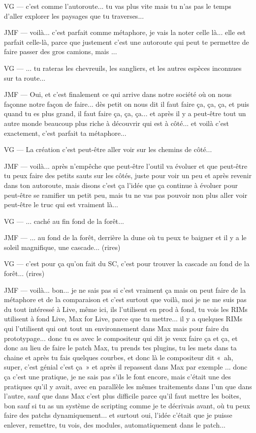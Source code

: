 VG — c'est comme l'autoroute... tu vas plus vite mais tu n'as pas le temps d'aller explorer les paysages que tu traverses...  

JMF — voilà... c'est parfait comme métaphore, je vais la noter celle là... elle est parfait celle-là, parce que justement c'est une autoroute qui peut te permettre de faire passer des gros camions, mais ... 

VG — ... tu rateras les chevreuils, les sangliers, et les autres espèces inconnues sur ta route... 

JMF — Oui, et c'est finalement ce qui arrive dans notre société où on nous façonne notre façon de faire... dès petit on nous dit il faut faire ça, ça, ça, et puis quand tu es plus grand, il faut faire ça, ça, ça... et après il y a peut-être tout un autre monde beaucoup plus riche à découvrir qui est à côté... et voilà c'est exactement, c'est parfait ta métaphore... 

VG — La création c'est peut-être aller voir sur les chemins de côté... 

JMF — voilà... après n'empêche que peut-être l'outil va évoluer et que peut-être tu peux faire des petits sauts sur les côtés, juste pour voir un peu et après revenir dans ton autoroute, mais disons c'est ça l'idée que ça continue à évoluer pour peut-être se ramifier un petit peu, mais tu ne vas pas pouvoir non plus aller voir peut-être le truc qui est vraiment là... 

VG — ... caché au fin fond de la forêt... 

JMF — ... au fond de la forêt, derrière la dune où tu peux te baigner et il y a le soleil magnifique, une cascade... (rires) 

VG — c'est pour ça qu'on fait du SC, c'est pour trouver la cascade au fond de la forêt... (rires) 

JMF — voilà... bon... je ne sais pas si c'est vraiment ça mais on peut faire de la métaphore et de la comparaison et c'est surtout que voilà, moi je ne me suis pas du tout intéressé à Live, même ici, ils l'utilisent en prod à fond, tu vois les RIMs utilisent à fond Live, Max for Live, parce que tu mettre... il y a quelques RIMs qui l'utilisent qui ont tout un environnement dans Max mais pour faire du prototypage... donc tu es avec le compositeur qui dit je veux faire ça et ça, et donc au lieu de faire le patch Max, tu prends tes plugins, tu les mets dans ta chaine et après tu fais quelques courbes, et donc là le compositeur dit « ah, super, c'est génial c'est ça » et après il repassent dans Max par exemple ... donc ça c'est une pratique, je ne sais pas s'ils le font encore, mais c'était une des pratiques qu'il y avait, avec en parallèle les mêmes traitements dans l'un que dans l'autre, sauf que dans Max c'est plus difficile parce qu'il faut mettre les boites, bon sauf si tu as un système de scripting comme je te décrivais avant, où tu peux faire des patchs dynamiquement... et surtout oui, l'idée c'était que je puisse enlever, remettre, tu vois, des modules, automatiquement dans le patch...  

